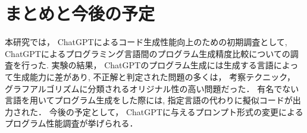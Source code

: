 \documentclass[a4j,twocolumn,9pt]{jarticle}
\begin{document}
\section{まとめと今後の予定}
本研究では， ChatGPTによるコード生成性能向上のための初期調査として, ChatGPTによるプログラミング言語間のプログラム生成精度比較についての調査を行った.
実験の結果， ChatGPTのプログラム生成には生成する言語によって生成能力に差があり, 不正解と判定された問題の多くは， 考察テクニック， グラフアルゴリズムに分類されるオリジナル性の高い問題だった．
有名でない言語を用いてプログラム生成をした際には, 指定言語の代わりに擬似コードが出力された． 
今後の予定として， ChatGPTに与えるプロンプト形式の変更によるプログラム性能調査が挙げられる． 



\end{document}

